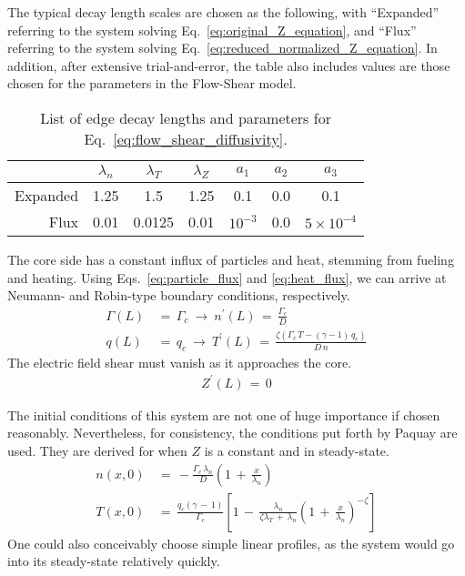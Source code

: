 The typical decay length scales are chosen as the following, with ``Expanded'' referring to the system solving Eq.~\ref{eq:original_Z_equation}, and ``Flux'' referring to the system solving Eq.~\ref{eq:reduced_normalized_Z_equation}.
In addition, after extensive trial-and-error, the table also includes values are those chosen for the parameters in the Flow-Shear model.
\begin{table}[h] %
\centering
	\begin{tabular}{r|ccc|ccc}
		& $\lambda_n$ & $\lambda_T$ & $\lambda_Z$ & $a_1$ & $a_2$ & $a_3$ \\ \hline
		Expanded & 1.25 & 1.5 & 1.25 & 0.1 & 0.0 & 0.1 \\ \hline
		Flux & 0.01 & 0.0125 & 0.01 & $10^{-3}$ & 0.0 & $5\times 10^{-4}$
	\end{tabular}
	\caption{List of edge decay lengths and parameters for Eq.~\ref{eq:flow_shear_diffusivity}.}
	\label{table:decay_lengths_FS_params}
\end{table}

The core side has a constant influx of particles and heat, stemming from fueling and heating.
Using Eqs.~\ref{eq:particle_flux} and \ref{eq:heat_flux}, we can arrive at Neumann- and Robin-type boundary conditions, respectively.
\begin{align} %
	\Gamma(L) \,&=\, \Gamma_c ~\longrightarrow~ n^\prime(L)
		\,=\, \frac{\Gamma_c}{D} \label{eq:core_particle_flux}\\
	q(L) \,&=\, q_c ~\longrightarrow~ T^\prime(L) \,=\, \frac{\zeta(
		\Gamma_c \, T - (\gamma - 1)\,q_c)}{D \, n} \label{eq:core_heat_flux}
\end{align}
The electric field shear must vanish as it approaches the core.
\begin{align} %
	Z^\prime(L) \,=\, 0 \label{eq:core_Z_boundary}
\end{align}

The initial conditions of this system are not one of huge importance if chosen reasonably.
Nevertheless, for consistency, the conditions put forth by Paquay \cite{paquay_studying_2012} are used.
They are derived for when $Z$ is a constant and in steady-state.
\begin{align} %
	n(x,0) \,&=\, -\frac{\Gamma_c \, \lambda_n}{D} \left(1 \,+\,
		\frac{x}{\lambda_n}\right) \label{eq:n_initial} \\
	T(x,0) \,&=\, \frac{q_c (\gamma \,-\, 1)}{\Gamma_c} \left[1 \,-\,
		\frac{\lambda_n}{\zeta\lambda_T \,+\, \lambda_n} \left(1 \,+\,
		\frac{x}{\lambda_n}\right)^{-\zeta}\right] \label{eq:T_initial}
\end{align}
One could also conceivably choose simple linear profiles, as the system would go into its steady-state relatively quickly.

